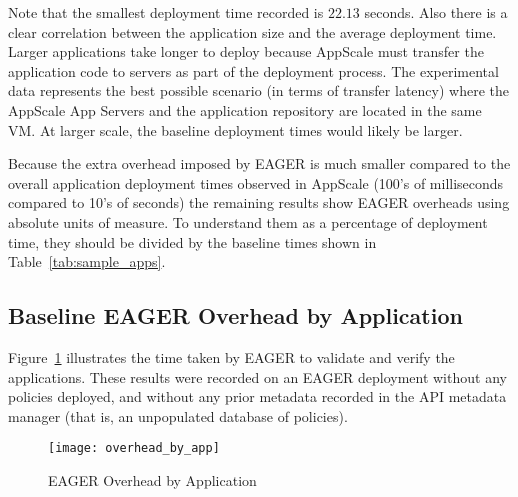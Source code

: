 Note that the smallest deployment time recorded is $22.13$ seconds. Also 
there is
a clear correlation between the application size and the average deployment
time. Larger applications take longer to deploy because AppScale must transfer
the application code to servers as part of the deployment
process.  The experimental data represents the best possible scenario (in
terms of transfer latency) where the AppScale App Servers and the application
repository are located in the same VM.  At larger scale, the baseline
deployment times would likely be larger.

Because the extra overhead imposed by EAGER is much smaller compared
to the overall application deployment times observed in AppScale
(100's of milliseconds compared to 10's of seconds) the remaining results show
EAGER overheads using absolute units of measure.  To understand them as a
percentage of deployment time, they should be divided by the baseline times
shown in Table~\ref{tab:sample_apps}.



\subsection{Baseline EAGER Overhead by Application}

Figure~\ref{fig:overhead_by_app} illustrates the time taken by EAGER to validate and verify the applications.
These results were recorded on an EAGER deployment without any policies deployed, and without any prior
metadata recorded in the API metadata manager (that is, an unpopulated 
database of policies).

\begin{figure}
\centering
\texttt{[image: overhead\_by\_app]}
\caption{EAGER Overhead by Application}
\label{fig:overhead_by_app}
\end{figure}


